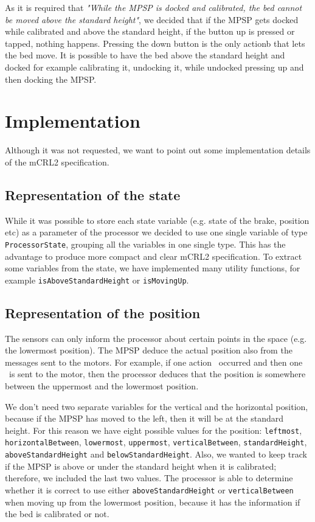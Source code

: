 As it is required that \emph{"While the MPSP is docked and calibrated,
the bed cannot be moved above the standard height"},
we decided that if the MPSP gets docked while calibrated and above the standard
height, if the button up is pressed or tapped, nothing happens.
Pressing the down button is the only actionb that lets the bed move.
It is possible to have the bed above the standard  height and docked
for example calibrating it, undocking it, while undocked pressing up
and then docking the MPSP.

\section{Implementation}

Although it was not requested, we want to point out some implementation details of the mCRL2 specification.

\subsection{Representation of the state}

While it was possible to store each state variable
(e.g. state of the brake, position etc) as a parameter of the processor
we decided to use one single variable of type \texttt{ProcessorState},
grouping all the variables in one single type. This has the advantage to produce more compact and clear mCRL2 specification.
To extract some variables from the state, we have implemented many utility
functions, for example \texttt{isAboveStandardHeight} or \texttt{isMovingUp}.

\subsection{Representation of the position}

The sensors can only inform the processor about certain points in the space (e.g. the lowermost position). The MPSP deduce the actual position also from the messages sent to the motors.
For example, if one action \lowermostReached\ occurred and then one \motorDown\ is sent to the motor, then the processor deduces that the position is somewhere between the uppermost and the lowermost position.

We don't need two separate variables for the vertical and the horizontal position, because if the MPSP has moved to the left, then it will be at the standard height.
For this reason we have eight possible values for the position:
\texttt{leftmost},
\texttt{horizontalBetween},
\texttt{lowermost},
\texttt{uppermost},
\texttt{verticalBetween},
\texttt{standardHeight},
\texttt{aboveStandardHeight} and
\texttt{belowStandardHeight}.
Also, we wanted to keep track if the MPSP is above or under the standard height when it is calibrated; therefore, we included the last two values.
The processor is able to determine whether it is correct to use either \texttt{aboveStandardHeight} or \texttt{verticalBetween} when moving up from the lowermost position, because it has the information if the bed is calibrated or not.

